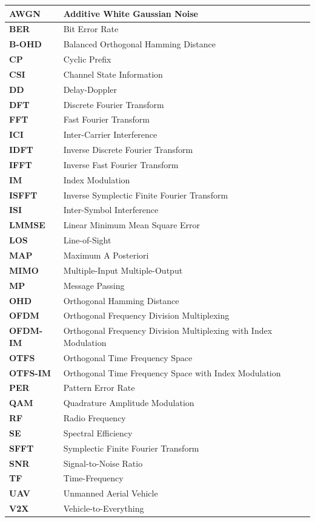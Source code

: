 \begin{longtable}{|>{\bfseries\centering\arraybackslash}p{}|>{\centering\arraybackslash}p{}|}
    AWGN & Additive White Gaussian Noise \\
    \hline
    BER & Bit Error Rate \\
    \hline
    B-OHD & Balanced Orthogonal Hamming Distance \\
    \hline
    CP & Cyclic Prefix \\
    \hline
    CSI & Channel State Information \\
    \hline
    DD & Delay-Doppler \\
    \hline
    DFT & Discrete Fourier Transform \\
    \hline
    FFT & Fast Fourier Transform \\
    \hline
    ICI & Inter-Carrier Interference \\
    \hline
    IDFT & Inverse Discrete Fourier Transform \\
    \hline
    IFFT & Inverse Fast Fourier Transform \\
    \hline
    IM & Index Modulation \\
    \hline
    ISFFT & Inverse Symplectic Finite Fourier Transform \\
    \hline
    ISI & Inter-Symbol Interference \\
    \hline
    LMMSE & Linear Minimum Mean Square Error \\
    \hline
    LOS & Line-of-Sight \\
    \hline
    MAP & Maximum A Posteriori \\
    \hline
    MIMO & Multiple-Input Multiple-Output \\
    \hline
    MP & Message Passing \\
    \hline
    OHD & Orthogonal Hamming Distance \\
    \hline
    OFDM & Orthogonal Frequency Division Multiplexing \\
    \hline
    OFDM-IM & Orthogonal Frequency Division Multiplexing with Index Modulation \\
    \hline
    OTFS & Orthogonal Time Frequency Space \\
    \hline
    OTFS-IM & Orthogonal Time Frequency Space with Index Modulation \\
    \hline
    PER & Pattern Error Rate \\
    \hline
    QAM & Quadrature Amplitude Modulation \\
    \hline
    RF & Radio Frequency \\
    \hline
    SE & Spectral Efficiency \\
    \hline
    SFFT & Symplectic Finite Fourier Transform \\
    \hline
    SNR & Signal-to-Noise Ratio \\
    \hline
    TF & Time-Frequency \\
    \hline
    UAV & Unmanned Aerial Vehicle \\
    \hline
    V2X & Vehicle-to-Everything \\
    \hline
\end{longtable}

\endgroup
